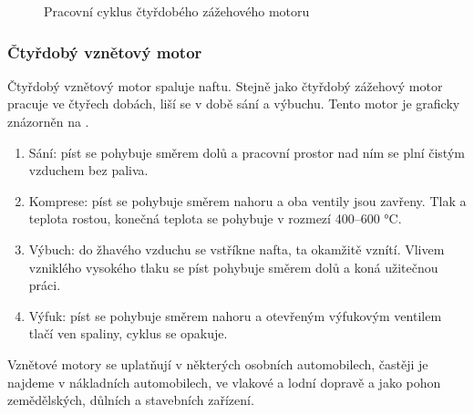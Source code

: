 \begin{figure}[H]
    
    \caption{Pracovní cyklus čtyřdobého zážehového motoru \jaDiag}
    \label{obr:PracovniCyklusCtyrdobehoZazehovehoMotoru}
\end{figure}

\newpage

\subsubsection{Čtyřdobý vznětový motor}
{Čtyřdobý vznětový motor spaluje naftu. Stejně jako čtyřdobý zážehový motor pracuje ve čtyřech dobách, liší se v době sání a výbuchu. Tento motor je graficky znázorněn na .}
\cite{CVUT:NávrhKonstrukceVznetovehoMotoru}
\begin{enumerate}
    \item {Sání: píst se pohybuje směrem dolů a pracovní prostor nad ním se plní čistým vzduchem bez paliva.}
    \item {Komprese: píst se pohybuje směrem nahoru a oba ventily jsou zavřeny. Tlak a teplota rostou, konečná teplota se pohybuje v rozmezí 400--600 °C.}
    \item {Výbuch: do žhavého vzduchu se vstříkne nafta, ta okamžitě vznítí. Vlivem vzniklého vysokého tlaku se píst pohybuje směrem dolů a koná užitečnou práci.}
    \item {Výfuk: píst se pohybuje směrem nahoru a otevřeným výfukovým ventilem tlačí ven spaliny, cyklus se opakuje.}
\end{enumerate}
{Vznětové motory se uplatňují v některých osobních automobilech, častěji je najdeme v nákladních automobilech, ve vlakové a lodní dopravě a jako pohon zemědělských, důlních a stavebních zařízení.}
\cite{CVUT:NávrhKonstrukceVznetovehoMotoru}

